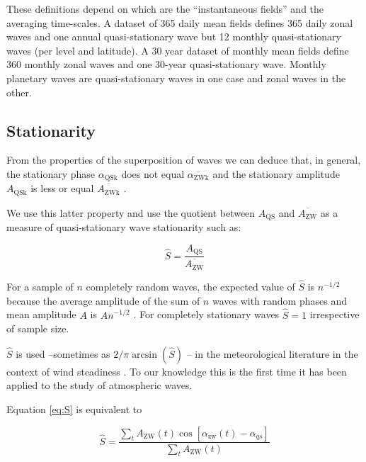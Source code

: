 \documentclass[draft,linenumbers]{agujournal2018}
\begin{document}
These definitions depend on which are the ``instantaneous fields'' and
the averaging time-scales. A dataset of 365 daily mean fields defines
365 daily zonal waves and one annual quasi-stationary wave but 12
monthly quasi-stationary waves (per level and latitude). A 30 year
dataset of monthly mean fields define 360 monthly zonal waves and one
30-year quasi-stationary wave. Monthly planetary waves are
quasi-stationary waves in one case and zonal waves in the other.

\subsection{Stationarity}

From the properties of the superposition of waves we can deduce that, in
general, the stationary phase \(\alpha_\mathrm{QSk}\) does not equal
\(\overline{\alpha_\mathrm{ZWk}}\) and the stationary amplitude
\(A_\mathrm{QSk}\) is less or equal \(\overline{A_\mathrm{ZWk}}\)
\citep{Pain2005}.

We use this latter property and use the quotient between
\(A_\mathrm{QS}\) and \(\overline{A_\mathrm{ZW}}\) as a measure of
quasi-stationary wave stationarity such as:

\begin{linenomath*}
\begin{equation}\label{eq:S}
\hat{S} = \frac{A_\mathrm{QS}}{\overline{A_\mathrm{ZW}}}
\end{equation}
\end{linenomath*}

For a sample of \(n\) completely random waves, the expected value of
\(\hat{S}\) is \(n^{-1/2}\) because the average amplitude of the sum of
\(n\) waves with random phases and mean amplitude \(A\) is \(An^{-1/2}\)
\citep{Pain2005}. For completely stationary waves \(\hat{S} = 1\)
irrespective of sample size.

\(\hat{S}\) is used --sometimes as
\(2/\pi\arcsin \left (\hat{S} \right )\) \citep{Singer1967}-- in the
meteorological literature in the context of wind steadiness
\citep[e.g][]{Hiscox2010}. To our knowledge this is the first time it
has been applied to the study of atmospheric waves.

Equation \ref{eq:S} is equivalent to

\begin{linenomath*}
\begin{equation}\label{eq:S2}
\hat{S} =   \frac{\sum_t A_\mathrm{ZW}(t) \cos  \left [\alpha_\mathrm{zw}(t) - \alpha_{qs} \right ]}{\sum_t A_\mathrm{ZW}(t)}
\end{equation}
\end{linenomath*}
\end{document}
